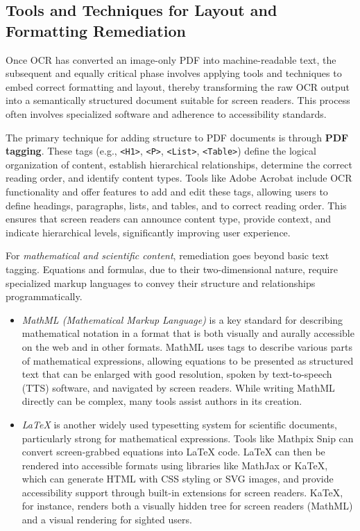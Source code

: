 \subsection{Tools and Techniques for Layout and Formatting Remediation}

Once OCR has converted an image-only PDF into machine-readable text, the subsequent and equally critical phase involves applying tools and techniques to embed correct formatting and layout, thereby transforming the raw OCR output into a semantically structured document suitable for screen readers. This process often involves specialized software and adherence to accessibility standards.

The primary technique for adding structure to PDF documents is through \textbf{PDF tagging}. These tags (e.g., \texttt{<H1>}, \texttt{<P>}, \texttt{<List>}, \texttt{<Table>}) define the logical organization of content, establish hierarchical relationships, determine the correct reading order, and identify content types. \cite{UWDocInfo, DevToPDFStructure} Tools like Adobe Acrobat include OCR functionality and offer features to add and edit these tags, allowing users to define headings, paragraphs, lists, and tables, and to correct reading order. \cite{CNDLSGeorgetownOCR, UWDocInfo} This ensures that screen readers can announce content type, provide context, and indicate hierarchical levels, significantly improving user experience. \cite{DevToPDFStructure}

For \emph{mathematical and scientific content}, remediation goes beyond basic text tagging. Equations and formulas, due to their two-dimensional nature, require specialized markup languages to convey their structure and relationships programmatically.
\begin{itemize}
    \item \emph{MathML (Mathematical Markup Language)} is a key standard for describing mathematical notation in a format that is both visually and aurally accessible on the web and in other formats. \cite{TPGIMathAccessible} MathML uses tags to describe various parts of mathematical expressions, allowing equations to be presented as structured text that can be enlarged with good resolution, spoken by text-to-speech (TTS) software, and navigated by screen readers. \cite{TPGIMathAccessible} While writing MathML directly can be complex, many tools assist authors in its creation. \cite{TPGIMathAccessible}
    \item \emph{LaTeX} is another widely used typesetting system for scientific documents, particularly strong for mathematical expressions. Tools like Mathpix Snip can convert screen-grabbed equations into LaTeX code. \cite{Mathpix} LaTeX can then be rendered into accessible formats using libraries like MathJax or KaTeX, which can generate HTML with CSS styling or SVG images, and provide accessibility support through built-in extensions for screen readers. \cite{TPGIMathAccessible} KaTeX, for instance, renders both a visually hidden tree for screen readers (MathML) and a visual rendering for sighted users. \cite{TPGIMathAccessible}
\end{itemize}

